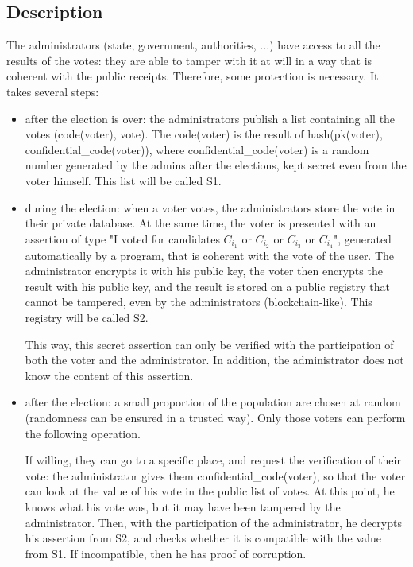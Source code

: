 \documentclass{article}
\begin{document}
\subsection{Description}

The administrators (state, government, authorities, ...) have access to all the results of the votes: they are able to tamper with it at will in a way that is coherent with the public receipts. Therefore, some protection is necessary. It takes several steps:
\begin{itemize}
    \item after the election is over: the administrators publish a list containing all the votes (code(voter), vote). The code(voter) is the result of hash(pk(voter), confidential\_code(voter)), where confidential\_code(voter) is a random number generated by the admins after the elections, kept secret even from the voter himself. This list will be called S1.
    \item during the election: when a voter votes, the administrators store the vote in their private database. At the same time, the voter is presented with an assertion of type "I voted for candidates $C_{i_1}$ or $C_{i_2}$ or $C_{i_3}$ or $C_{i_4}$", generated automatically by a program, that is coherent with the vote of the user. The administrator encrypts it with his public key, the voter then encrypts the result with his public key, and the result is stored on a public registry that cannot be tampered, even by the administrators (blockchain-like). This registry will be called S2.
    
    This way, this secret assertion can only be verified with the participation of both the voter and the administrator. In addition, the administrator does not know the content of this assertion. 
    
    \item after the election: a small proportion of the population are chosen at random (randomness can be ensured in a trusted way). Only those voters can perform the following operation.
    
    If willing, they can go to a specific place, and request the verification of their vote: the administrator gives them confidential\_code(voter), so that the voter can look at the value of his vote in the public list of votes. At this point, he knows what his vote was, but it may have been tampered by the administrator. Then, with the participation of the administrator, he decrypts his assertion from S2, and checks whether it is compatible with the value from S1. If incompatible, then he has proof of corruption. 
\end{itemize}
\end{document}
